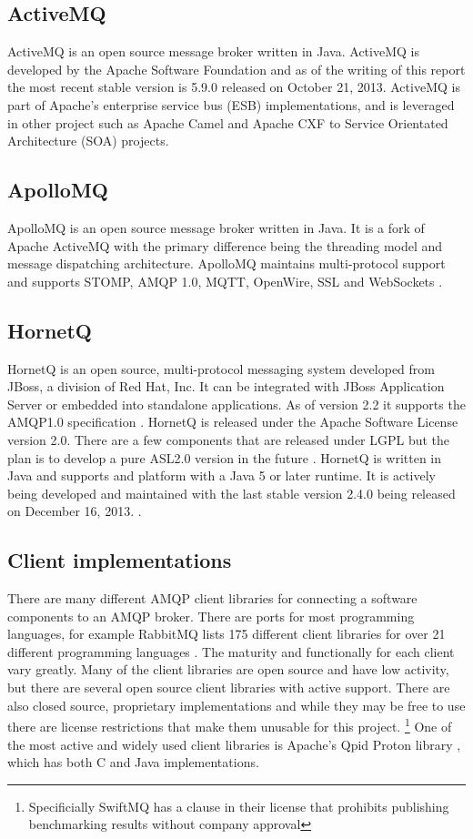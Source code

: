 \documentclass{thesis}
\begin{document}
\subsection{ActiveMQ}
ActiveMQ is an open source message broker written in Java.  ActiveMQ is developed by the Apache Software Foundation and as of the writing of this report the most recent stable version is 5.9.0 released on October 21, 2013.  ActiveMQ is part of Apache's enterprise service bus (ESB) implementations, and is leveraged in other project such as Apache Camel and Apache CXF to Service Orientated Architecture (SOA) projects. 

\subsection{ApolloMQ}
ApolloMQ is an open source message broker written in Java.  It is a fork of Apache ActiveMQ with the primary difference being the threading model and message dispatching architecture.  ApolloMQ maintains multi-protocol support and supports STOMP, AMQP 1.0, MQTT, OpenWire, SSL and WebSockets \cite{APOLLO}.

\subsection{HornetQ}
HornetQ is an open source, multi-protocol messaging system developed from JBoss, a division of Red Hat, Inc.  It can be integrated with JBoss Application Server or embedded into standalone applications.  As of version 2.2 it supports the AMQP1.0 specification \cite{HORNETQ_ROADMAP}.  HornetQ is released under the Apache Software License version 2.0.  There are a few components that are released under LGPL but the plan is to develop a pure ASL2.0 version in the future .  HornetQ is written in Java and supports and platform with a Java 5 or later runtime.   It is actively being developed and maintained with the last stable version 2.4.0 being released on December 16, 2013. \cite{HORNETQ}.  

\subsection{Client implementations}
There are many different AMQP client libraries for connecting a software components to an AMQP broker.  There are ports for most programming languages, for example RabbitMQ lists 175 different client libraries for over 21 different programming languages \cite{RABBITMQ_CLIENTS}.  The maturity and functionally for each client vary greatly.  Many of the client libraries are open source and have low activity, but there are several open source client libraries with active support.  There are also closed source, proprietary implementations and while they may be free to use there are license restrictions that make them unusable for this project. \footnote{Specificially SwiftMQ has a clause in their license that prohibits publishing benchmarking results without company approval} One of the most active and widely used client libraries is Apache's Qpid Proton library \cite{QPID_PROTON}, which has both C and Java implementations.  
\end{document}
